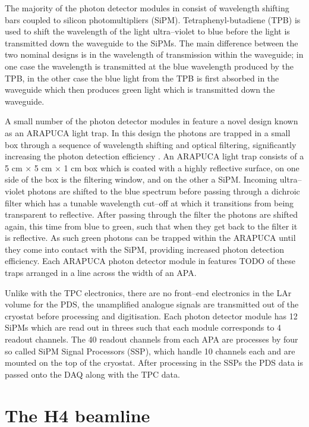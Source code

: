The majority of the photon detector modules in \protodune{} consist of 
wavelength shifting bars coupled to silicon photomultipliers (SiPM). 
Tetraphenyl-butadiene (TPB) is used to shift the wavelength of the light 
ultra--violet to blue before the light is transmitted down the waveguide to 
the SiPMs. The main difference between the two nominal designs is in the 
wavelength of transmission within the waveguide; in one case the wavelength is 
transmitted at the blue wavelength produced by the TPB, in the other case the 
blue light from the TPB is first absorbed in the waveguide which then produces 
green light which is transmitted down the waveguide.

A small number of the photon detector modules in \protodune{} feature a novel 
design known as an ARAPUCA light trap. In this design the photons are trapped 
in a small box through a sequence of wavelength shifting and optical 
filtering, significantly increasing the photon detection efficiency 
\cite{Segreto:2018jdx}. An ARAPUCA light trap consists of a 5 cm $\times$ 5 cm 
$\times$ 1 cm box which is coated with a highly reflective surface, on one 
side of the box is the filtering window, and on the other a SiPM. Incoming 
ultra--violet photons are shifted to the blue spectrum before passing through 
a dichroic filter which has a tunable wavelength cut--off at which it 
transitions from being transparent to reflective. After passing through the 
filter the photons are shifted again, this time from blue to green, such that 
when they get back to the filter it is reflective. As such green photons can 
be trapped within the ARAPUCA until they come into contact with the SiPM, 
providing increased photon detection efficiency. Each ARAPUCA photon detector 
module in \protodune{} features TODO of these traps arranged in a line across 
the width of an APA.

Unlike with the TPC electronics, there are no front--end electronics in the LAr
volume for the PDS, the unamplified analogue signals are transmitted out of the
cryostat before processing and digitisation. Each photon detector module has 
12 SiPMs which are read out in threes such that each module corresponds to 4 
readout channels. The 40 readout channels from each APA are processes by four 
so called SiPM Signal Processors (SSP), which handle 10 channels each and are 
mounted on the top of the cryostat. After processing in the SSPs the PDS data is
passed onto the DAQ along with the TPC data.

\section{The H4 beamline} \label{sec:h4}

